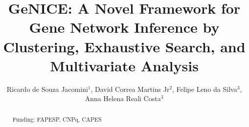 \documentclass[twoside]{article}
\title{\vspace{-15mm}\fontsize{24pt}{10pt}\selectfont\textbf{GeNICE: A Novel Framework for Gene Network Inference by Clustering, Exhaustive Search, and Multivariate Analysis}} %
\author{Ricardo de Souza Jacomini$^1$, David Correa Martins Jr$^2$, Felipe Leno da Silva$^3$, Anna Helena Reali Costa$^3$}
\affil{1 USP\\ 2 UFABC\\ 3 ESCOLA POLIT\'ECNICA DA USP\\ }
\date{}
\begin{document}
\maketitle %

\thispagestyle{fancy} %


\begin{abstract}


Funding: FAPESP, CNPq, CAPES
\end{abstract}
\end{document}
